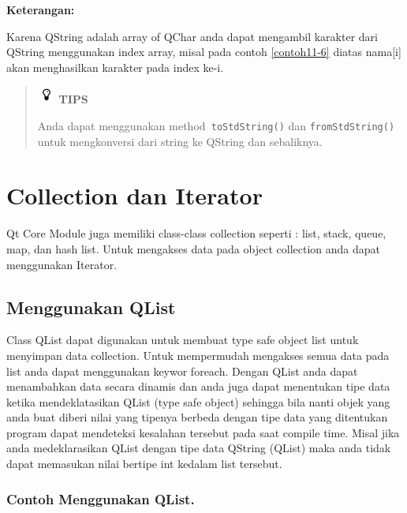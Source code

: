 \textbf{Keterangan:}

  Karena QString adalah array of QChar anda dapat mengambil karakter
  dari QString menggunakan index array, misal pada contoh \ref{contoh11-6} diatas
  nama{[}i{]} akan menghasilkan karakter pada index ke-i.

\begin{quotation}
\includegraphics{../manuscript/images/tips.png} 	\textbf{TIPS} 
	
	Anda dapat
	menggunakan method\texttt{ toStdString()} dan \texttt{fromStdString()} untuk mengkonversi
	dari string ke QString dan sebaliknya.
\end{quotation}
 

\section{Collection dan Iterator}\label{collection-dan-iterator}

Qt Core Module juga memiliki class-class collection seperti : list,
stack, queue, map, dan hash list. Untuk mengakses data pada object
collection anda dapat menggunakan Iterator.

\subsection{Menggunakan QList}\label{menggunakan-qlist}

Class QList dapat digunakan untuk membuat type safe object list untuk
menyimpan data collection. Untuk mempermudah mengakses semua data pada
list anda dapat menggunakan keywor foreach. Dengan QList anda dapat
menambahkan data secara dinamis dan anda juga dapat menentukan tipe data
ketika mendeklatasikan QList (type safe object) sehingga bila nanti
objek yang anda buat diberi nilai yang tipenya berbeda dengan tipe data
yang ditentukan program dapat mendeteksi kesalahan tersebut pada saat
compile time. Misal jika anda medeklarasikan QList dengan tipe data
QString (QList) maka anda tidak dapat memasukan nilai bertipe int
kedalam list tersebut.

\subsubsection*{Contoh Menggunakan QList.}

